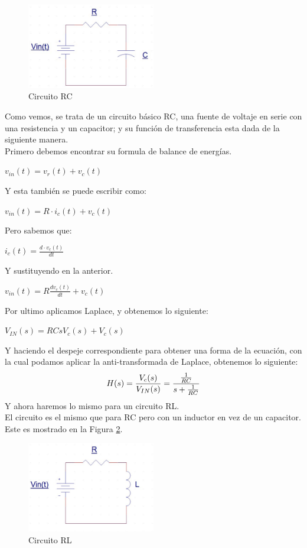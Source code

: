 \documentclass[letterpaper,spanish,12pt]{report}
\begin{document}
	\begin{figure}[h]
		\centering
			\includegraphics[width=0.50\textwidth]{RC.eps}
		\caption{Circuito RC}
		\label{fig:RC}
	\end{figure}

Como vemos, se trata de un circuito b\'asico RC, una fuente de voltaje en serie con una resistencia y un capacitor; y su funci\'on de transferencia esta dada de la siguiente manera.\medskip \\ Primero debemos encontrar su formula de balance de energ\'ias.
	\begin{center} $v_{in}(t) = v_{r}(t) + v_{c}(t)$\end{center}
Y esta tambi\'en se puede escribir como:
	\begin{center} $v_{in}(t) = R \cdot i_{c}(t) + v_{c}(t)$\end{center}
Pero sabemos que:
	\begin{center} $i_{c}(t) = \frac{d \cdot v_{c}(t)}{dt}$\end{center}
Y sustituyendo en la anterior.
	\begin{center} $v_{in}(t) = R\frac{dv_{c}(t)}{dt} + v_{c}(t)$\end{center}
Por ultimo aplicamos Laplace, y obtenemos lo siguiente:
	\begin{center} $V_{IN}(s) = RCsV_{c}(s) + V_{c}(s)$\end{center}
Y haciendo el despeje correspondiente para obtener una forma de la ecuaci\'on, con la cual podamos aplicar la anti-transformada de Laplace, obtenemos lo siguiente:
	\begin{equation}
		\centering
		H(s) = \frac{V_{c}(s)}{V_{IN}(s)} = \frac{\frac{1}{RC}}{s + \frac{1}{RC}}
		\label{ec:1}
	\end{equation}
Y ahora haremos lo mismo para un circuito RL.\medskip \\El circuito es el mismo que para RC pero con un inductor en vez de un capacitor. Este es mostrado en la Figura \ref{fig:RL}.\medskip

	\begin{figure}[h]
		\centering
			\includegraphics[width=0.50\textwidth]{RL.eps}
		\caption{Circuito RL}
		\label{fig:RL}
	\end{figure}
\end{document}
